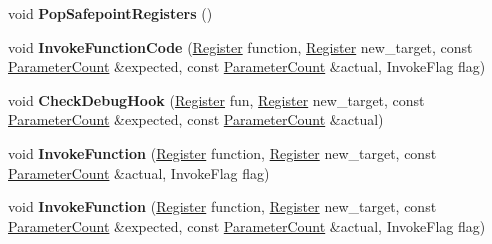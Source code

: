 \begin{DoxyCompactItemize}
\item 
\mbox{\label{classv8_1_1internal_1_1MacroAssembler_accf004371b050ef53eb57724f4d8d8b1}} 
void {\bfseries Pop\+Safepoint\+Registers} ()
\item 
\mbox{\label{classv8_1_1internal_1_1MacroAssembler_a45a3612fb3be7000eb94309ac385674b}} 
void {\bfseries Invoke\+Function\+Code} (\mbox{\hyperlink{classv8_1_1internal_1_1Register}{Register}} function, \mbox{\hyperlink{classv8_1_1internal_1_1Register}{Register}} new\+\_\+target, const \mbox{\hyperlink{classv8_1_1internal_1_1ParameterCount}{Parameter\+Count}} \&expected, const \mbox{\hyperlink{classv8_1_1internal_1_1ParameterCount}{Parameter\+Count}} \&actual, Invoke\+Flag flag)
\item 
\mbox{\label{classv8_1_1internal_1_1MacroAssembler_a2cf2b9ab50d1b6efcd90587f2502451b}} 
void {\bfseries Check\+Debug\+Hook} (\mbox{\hyperlink{classv8_1_1internal_1_1Register}{Register}} fun, \mbox{\hyperlink{classv8_1_1internal_1_1Register}{Register}} new\+\_\+target, const \mbox{\hyperlink{classv8_1_1internal_1_1ParameterCount}{Parameter\+Count}} \&expected, const \mbox{\hyperlink{classv8_1_1internal_1_1ParameterCount}{Parameter\+Count}} \&actual)
\item 
\mbox{\label{classv8_1_1internal_1_1MacroAssembler_a9a69d864f46bb7b56e46d977b24a9fc4}} 
void {\bfseries Invoke\+Function} (\mbox{\hyperlink{classv8_1_1internal_1_1Register}{Register}} function, \mbox{\hyperlink{classv8_1_1internal_1_1Register}{Register}} new\+\_\+target, const \mbox{\hyperlink{classv8_1_1internal_1_1ParameterCount}{Parameter\+Count}} \&actual, Invoke\+Flag flag)
\item 
\mbox{\label{classv8_1_1internal_1_1MacroAssembler_a5d98c1d5fa34f859227cbae4a47442ee}} 
void {\bfseries Invoke\+Function} (\mbox{\hyperlink{classv8_1_1internal_1_1Register}{Register}} function, \mbox{\hyperlink{classv8_1_1internal_1_1Register}{Register}} new\+\_\+target, const \mbox{\hyperlink{classv8_1_1internal_1_1ParameterCount}{Parameter\+Count}} \&expected, const \mbox{\hyperlink{classv8_1_1internal_1_1ParameterCount}{Parameter\+Count}} \&actual, Invoke\+Flag flag)
\item 

\end{DoxyCompactItemize}
